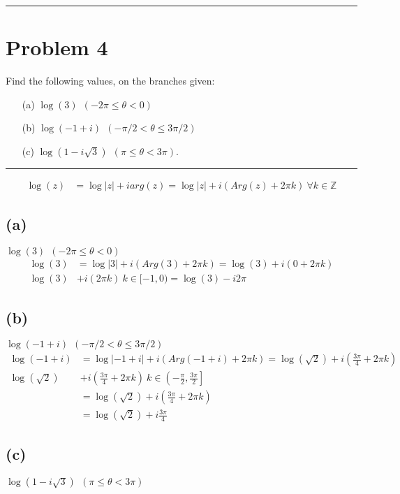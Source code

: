 \documentclass{article}
\begin{document}
\vspace{.5cm} %

\hrule

\newpage
\section*{Problem 4}
Find the following values, on the branches given:
\begin{enumerate}
	\item [(a)] $ \log(3) \ \ (-2\pi \leq \theta < 0)$ 
	\item [(b)] $ \log(-1 + i) \ \ (-\pi/2 < \theta \leq 3 \pi / 2)$
	\item [(c)] $ \log(1 - i \sqrt 3) \ \ (\pi \leq \theta < 3 \pi)$.
\end{enumerate}
\hrule
\vspace{.5cm} %

\begin{align*}
  \log(z) &= \log{|z|} + iarg(z) = \log{|z|} + i(Arg(z) + 2\pi k)\ \forall k \in \mathbb{Z}
\end{align*}
\subsection*{(a)}
$ \log{(3)} \ \ (-2\pi \leq \theta < 0)$
\begin{align*}
  \log{(3)} &=  \log{|3|} + i(Arg(3) + 2\pi k)= \log{(3)} + i(0 +  2\pi k)\\
  \log{(3)} &+ i(2\pi k)\ k \in [-1,0) = \log{(3)} - i2\pi
\end{align*}
\subsection*{(b)}
$ \log(-1 + i) \ \ (-\pi/2 < \theta \leq 3 \pi / 2)$
\begin{align*}
  \log{(-1 + i)} &=  \log{|-1 + i|} + i(Arg(-1 + i) + 2\pi k)= \log{(\sqrt{2})} + i\left(\frac{3\pi}{4} +  2\pi k\right)\\
  \log{(\sqrt{2})} &+ i\left(\frac{3\pi}{4}+2\pi k\right)\ k \in \left(-\frac{\pi}{2}, \frac{3\pi}{2}\right]\\
                 &= \log{(\sqrt{2})} + i\left(\frac{3\pi}{4}+2\pi k\right) \\
                 &= \log{(\sqrt{2})} + i\frac{3\pi}{4}
\end{align*}
\subsection*{(c)}
$ \log(1 - i \sqrt 3) \ \ (\pi \leq \theta < 3 \pi)$
\begin{align*}
  
\end{align*}
\newpage
\end{document}

